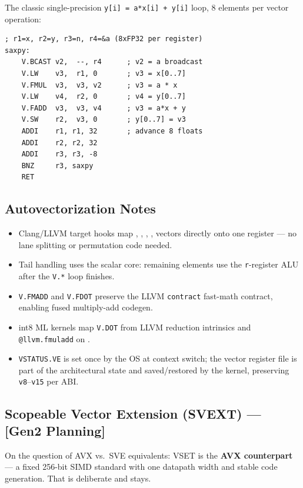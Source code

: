 \documentclass[11pt,a4paper]{article}
\begin{document}
The classic single-precision {\tt y[i] = a*x[i] + y[i]} loop, 8 elements per
vector operation:

\begin{lstlisting}[style=asmstyle]
    ; r1=x, r2=y, r3=n, r4=&a (8xFP32 per register)
saxpy:
    V.BCAST v2,  --, r4      ; v2 = a broadcast
    V.LW    v3,  r1, 0       ; v3 = x[0..7]
    V.FMUL  v3,  v3, v2      ; v3 = a * x
    V.LW    v4,  r2, 0       ; v4 = y[0..7]
    V.FADD  v3,  v3, v4      ; v3 = a*x + y
    V.SW    r2,  v3, 0       ; y[0..7] = v3
    ADDI    r1, r1, 32       ; advance 8 floats
    ADDI    r2, r2, 32
    ADDI    r3, r3, -8
    BNZ     r3, saxpy
    RET
\end{lstlisting}

\subsection{Autovectorization Notes}

\begin{itemize}[nosep]
  \item Clang/LLVM target hooks map {\tt <8 x float>}, {\tt <4 x double>},
        {\tt <8 x i32>}, {\tt <16 x i16>}, {\tt <32 x i8>} vectors directly
        onto one register --- no lane splitting or permutation code needed.
  \item Tail handling uses the scalar core: remaining elements use the
        {\tt r}-register ALU after the {\tt V.*} loop finishes.
  \item {\tt V.FMADD} and {\tt V.FDOT} preserve the LLVM
        {\tt contract} fast-math contract, enabling fused multiply-add codegen.
  \item int8 ML kernels map {\tt V.DOT} from LLVM reduction
        intrinsics and {\tt @llvm.fmuladd} on {\tt <32 x i8>}.
  \item {\tt VSTATUS.VE} is set once by the OS at context switch; the vector
        register file is part of the architectural state and saved/restored
        by the kernel, preserving {\tt v8}--{\tt v15} per ABI.
\end{itemize}

\subsection{Scopeable Vector Extension (SVEXT) --- [Gen2 Planning]}

On the question of AVX vs.\ SVE equivalents: VSET is the \textbf{AVX
counterpart} --- a fixed 256-bit SIMD standard with one datapath width and
stable code generation. That is deliberate and stays.
\end{document}
